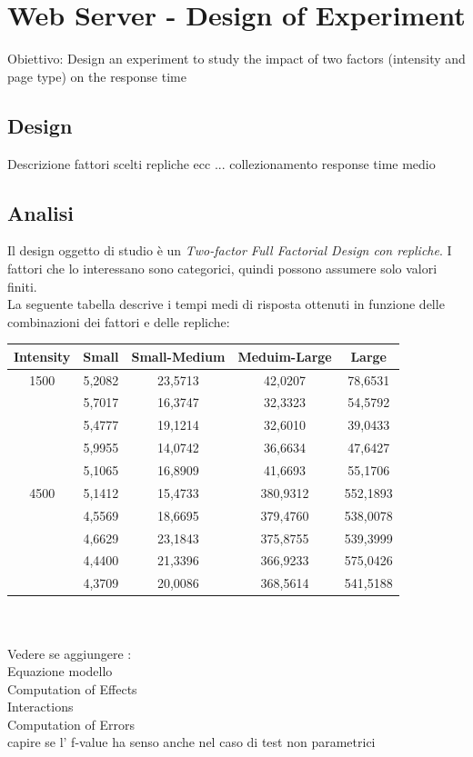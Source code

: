 \chapter{Web Server - Design of Experiment}
Obiettivo: Design an experiment to study the impact of two factors (intensity and page type) on the response time
\section{Design}
Descrizione fattori scelti repliche ecc ...
collezionamento response time medio
\section{Analisi}
Il design oggetto di studio è un \textit{Two-factor Full Factorial Design con repliche}.
I fattori che lo interessano sono categorici, quindi possono assumere solo valori finiti. 
\\La seguente tabella descrive i tempi medi di risposta ottenuti in funzione delle combinazioni dei fattori e delle repliche:
\\
\begin{table}[h]
	\begin{center}
		\begin{tabular}{|c|c|c|c|c|}
			\hline
			Intensity & Small & Small-Medium & Meduim-Large & Large\\
			\hline
			\rule[-4mm]{0mm}{0.5cm}
			1500 & 5,2082 & 23,5713 & 42,0207 & 78,6531\\
			\rule[-4mm]{0mm}{0.5cm}
			& 5,7017 & 16,3747 & 32,3323 & 54,5792\\
			\rule[-4mm]{0mm}{0.5cm}
			& 5,4777 & 19,1214 & 32,6010 & 39,0433\\
			\rule[-4mm]{0mm}{0.5cm}
			& 5,9955 & 14,0742 & 36,6634 & 47,6427\\	
			\rule[-4mm]{0mm}{0.5cm}
			& 5,1065 & 16,8909 & 41,6693 & 55,1706\\ 
			\hline
			\rule[-0.5cm]{0mm}{0.5cm}
			4500 & 5,1412 & 15,4733 & 380,9312 & 552,1893\\
			\rule[-0.5cm]{0mm}{0.5cm}
			& 4,5569 & 18,6695 & 379,4760 & 538,0078\\
			\rule[-0.5cm]{0mm}{0.5cm}
			& 4,6629 & 23,1843 & 375,8755 & 539,3999\\
			\rule[-0.5cm]{0mm}{0.5cm}
			& 4,4400 & 21,3396 & 366,9233 & 575,0426\\	
			\rule[-0.5cm]{0mm}{0.5cm}
			& 4,3709 & 20,0086 & 368,5614 & 541,5188\\
			\hline
		\end{tabular}
	\end{center}
\end{table}
\\
\\
Vedere se aggiungere :
\\Equazione modello
\\Computation of Effects
\\Interactions
\\Computation of Errors
\\capire se l' f-value ha senso anche nel caso di test non parametrici
